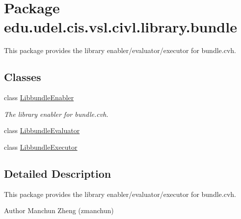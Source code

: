\hypertarget{namespaceedu_1_1udel_1_1cis_1_1vsl_1_1civl_1_1library_1_1bundle}{}\section{Package edu.\+udel.\+cis.\+vsl.\+civl.\+library.\+bundle}
\label{namespaceedu_1_1udel_1_1cis_1_1vsl_1_1civl_1_1library_1_1bundle}


This package provides the library enabler/evaluator/executor for bundle.\+cvh.  


\subsection*{Classes}
\begin{DoxyCompactItemize}
\item 
class \hyperlink{classedu_1_1udel_1_1cis_1_1vsl_1_1civl_1_1library_1_1bundle_1_1LibbundleEnabler}{Libbundle\+Enabler}
\begin{DoxyCompactList}\small\item\em The library enabler for bundle.\+cvh. \end{DoxyCompactList}\item 
class \hyperlink{classedu_1_1udel_1_1cis_1_1vsl_1_1civl_1_1library_1_1bundle_1_1LibbundleEvaluator}{Libbundle\+Evaluator}
\item 
class \hyperlink{classedu_1_1udel_1_1cis_1_1vsl_1_1civl_1_1library_1_1bundle_1_1LibbundleExecutor}{Libbundle\+Executor}
\end{DoxyCompactItemize}


\subsection{Detailed Description}
This package provides the library enabler/evaluator/executor for bundle.\+cvh. 

\begin{DoxyAuthor}{Author}
Manchun Zheng (zmanchun) 
\end{DoxyAuthor}
